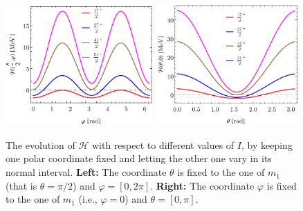\begin{figure}
    \centering
    \includegraphics[width=0.5\textwidth]{Chapters/Figures/parity-partners-plots/H-minimal-m1-phi.pdf}
    \includegraphics[width=0.485\textwidth]{Chapters/Figures/parity-partners-plots/H-minimal-m1-theta.pdf}
    \caption{The evolution of $\mathcal{H}$ with respect to different values of $I$, by keeping one polar coordinate fixed and letting the other one vary in its normal interval. \textbf{Left:} The coordinate $\theta$ is fixed to the one of $m_1$ (that is $\theta=\pi/2$) and $\varphi=[0,2\pi]$. \textbf{Right:} The coordinate $\varphi$ is fixed to the one of $m_1$ (i.e., $\varphi=0$) and $\theta=[0,\pi]$.}
    \label{CEF-theta-phi-dependence}
\end{figure}

